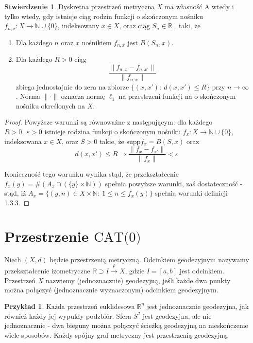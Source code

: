 \documentclass[licencjacka]{pracamgr}
\theoremstyle{definition}
\theoremstyle{definition}
\theoremstyle{definition}
\newtheorem{proposition}{Stwierdzenie}[section]
\theoremstyle{definition}
\newtheorem{example}{Przykład}[section]
\theoremstyle{definition}
\theoremstyle{plain}
\theoremstyle{plain}
\begin{document}
\begin{proposition}
	Dyskretna przestrzeń metryczna $ X $ ma własność A wtedy i tylko wtedy, gdy 
	istnieje ciąg rodzin funkcji o skończonym nośniku $ f_{n,x} : X \rightarrow \mathbb{N}
	\cup \{0\} $, indeksowany $ x \in X $, oraz ciąg $ S_n \in \mathbb{R}_{+} $ taki, że
	\begin{enumerate}
		\item Dla każdego $ n $ oraz $ x $ nośnikiem $ f_{n,x} $ jest $ B(S_n, x) $.
		\item Dla każdego $ R > 0 $ ciąg $$ \frac{\| f_{n,x} - f_{n,x'} \|}{\| f_{n,x} \|} $$
		zbiega jednostajnie do zera na zbiorze $ \{ (x,x'): ~ d(x,x') \leq R\} $ przy 
		$ n \rightarrow \infty $. Norma $ \| \cdot \| $ oznacza normę $ \ell_1 $ na 
		przestrzeni funkcji na o skończonym nośniku określonych na $ X $.
	\end{enumerate}
\end{proposition}
\begin{proof}
	Powyższe warunki są równoważne z następującym: dla każdego $ R>0, ~ \varepsilon > 0 $ 
	istnieje rodzina funkcji o skończonym nośniku $ f_x : X \rightarrow \mathbb{N} \cup 
	\{0\}$, indeksowana $ x \in X $, oraz $ S > 0 $ takie, że $ \text{supp}{f_x} = B(S,x)  $ 
	oraz $$ d(x,x') \leq R \Rightarrow \frac{\| f_x - f_{x'} \|}{\|f_x \|} < \varepsilon $$

	Konieczność tego warunku wynika stąd, że przekształcenie $ f_x(y) = \#\left( A_x \cap \left( 
	\{y\} \times \mathbb{N} \right) \right) $ spełnia powyższe warunki, zaś dostateczność - 
	stąd, iż $ A_x = \{(y,n) \in X \times \mathbb{N} : ~ 1 \leq n \leq f_x(y) \} $ spełnia 
	warunki definicji 1.3.3.
\end{proof}



\section{Przestrzenie $\text{CAT(0)}$}
Niech $ (X, d) $ będzie przestrzenią metryczną. Odcinkiem geodezyjnym nazywamy 
przekształcenie izometryczne $ \mathbb{R} \supset I \xrightarrow{\rho} X $, gdzie 
$ I =[a,b]$ jest odcinkiem. Przestrzeń $ X $ nazwiemy (jednoznacznie) geodezyjną, 
jeśli każde dwa punkty można połączyć (jednoznacznie wyznaczonym) odcinkiem 
geodezyjnym.

\begin{example}
	Każda przestrzeń euklidesowa $ \mathbb{R}^n $ jest jednoznacznie geodezyjna, 
	jak również każdy jej wypukły podzbiór. Sfera $ S^2 $ jest geodezyjna, ale 
	nie jednoznacznie - dwa bieguny można połączyć ścieżką geodezyjną na 
	nieskończenie wiele sposobów. Każdy spójny graf metryczny jest przestrzenią 
	geodezyjną.
\end{example}
\end{document}
